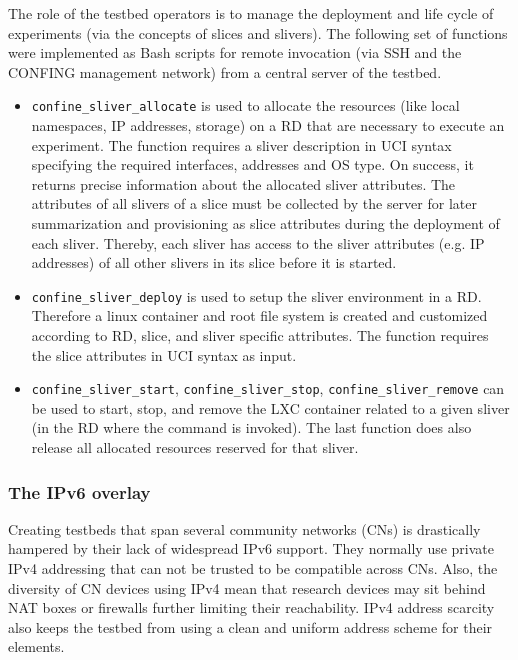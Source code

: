 \documentclass[conference]{IEEEtran}
\begin{document}
The role of the testbed operators is to manage the deployment and life
cycle of experiments (via the concepts of slices and slivers). The
following set of functions were implemented as Bash scripts for remote
invocation (via SSH and the CONFING management network) from a central
server of the testbed.
\begin{itemize}
\item \texttt{confine\_sliver\_allocate} is used to allocate the resources
  (like local namespaces, IP addresses, storage) on a RD that are
  necessary to execute an experiment. The function requires a sliver
  description in UCI syntax specifying the required interfaces,
  addresses and OS type. On success, it returns precise information
  about the allocated sliver attributes. The attributes of all slivers
  of a slice must be collected by the server for later summarization
  and provisioning as slice attributes during the deployment of each
  sliver. Thereby, each sliver has access to the sliver attributes (e.g. IP
  addresses) of all other slivers in its slice before it is started.
\item \texttt{confine\_sliver\_deploy} is used to setup the sliver environment
  in a RD. Therefore a linux container and root file system is created
  and customized according to RD, slice, and sliver specific
  attributes.  The function requires the slice attributes in UCI
  syntax as input.
\item \texttt{confine\_sliver\_start}, \texttt{confine\_sliver\_stop},
  \texttt{confine\_sliver\_remove} can be used to start, stop, and remove the
  LXC container related to a given sliver (in the RD where the command
  is invoked). The last function does also release all allocated
  resources reserved for that sliver.

\end{itemize}





\subsubsection{The IPv6 overlay}

Creating testbeds that span several community networks (CNs) is drastically
hampered by their lack of widespread IPv6 support.  They normally use private
IPv4 addressing that
can not be trusted to be compatible across CNs.  Also,
the diversity of CN devices using IPv4 mean that research devices may sit
behind NAT boxes or firewalls further limiting their reachability.  IPv4
address scarcity also keeps the testbed from using a clean and uniform
address scheme for their elements.
\end{document}
